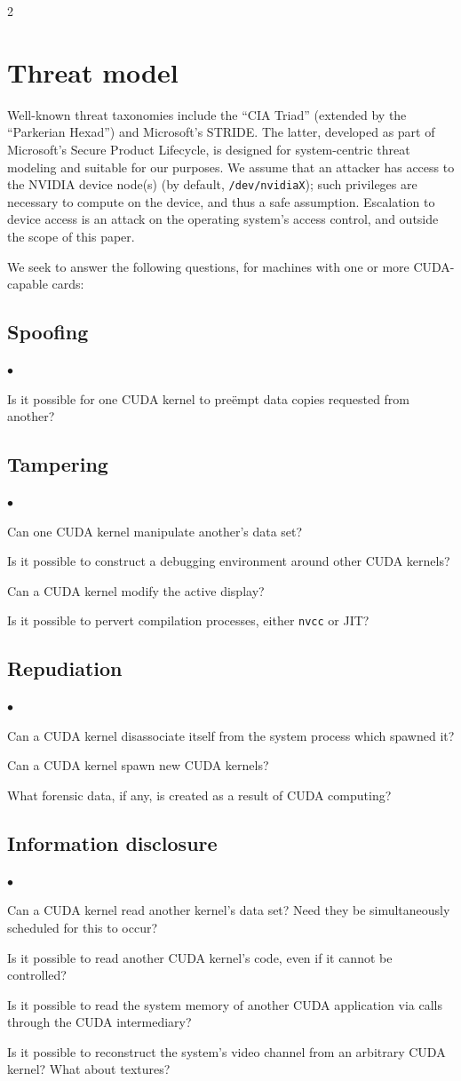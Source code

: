 \documentclass[letterpaper,10pt]{article}
\newcommand{\squishlist}{\begin{list}{$\bullet$}
  {\setlength{\itemsep}{0pt}
    \setlength{\parsep}{3pt}
    \setlength{\topsep}{3pt}
    \setlength{\partopsep}{0pt}
    \setlength{\leftmargin}{1.5em}
    \setlength{\labelwidth}{1em}
    \setlength{\labelsep}{0.5em}
  } }
\newcommand{\squishend}{\end{list}}
\begin{document}
\begin{multicols}{2}
\section{Threat model}
Well-known threat taxonomies include the ``CIA Triad'' (extended by the
``Parkerian Hexad\cite{sechandbook}'') and Microsoft's STRIDE\@. The latter, developed as part of
Microsoft's Secure Product Lifecycle, is designed for system-centric threat
modeling and suitable for our purposes. We assume that an attacker has access
to the NVIDIA device node(s) (by default, \texttt{/dev/nvidiaX}); such privileges
are necessary to compute on the device, and thus a safe assumption. Escalation
to device access is an attack on the operating system's access control, and
outside the scope of this paper.

We seek to answer the following questions, for machines with one or more CUDA-capable
cards:
\subsection{Spoofing}
\squishlist
\item Is it possible for one CUDA kernel to pre\"empt data copies requested
from another?
\squishend
\subsection{Tampering}
\squishlist
\item Can one CUDA kernel manipulate another's data set?
\item Is it possible to construct a debugging environment around other CUDA kernels?
\item Can a CUDA kernel modify the active display?
\item Is it possible to pervert compilation processes, either \texttt{nvcc} or JIT?
\squishend
\subsection{Repudiation}
\squishlist
\item Can a CUDA kernel disassociate itself from the system process which spawned it?
\item Can a CUDA kernel spawn new CUDA kernels?
\item What forensic data, if any, is created as a result of CUDA computing?
\squishend
\subsection{Information disclosure}
\squishlist
\item Can a CUDA kernel read another kernel's data set? Need they be simultaneously
scheduled for this to occur?
\item Is it possible to read another CUDA kernel's code, even if it cannot be
controlled?
\item Is it possible to read the system memory of another CUDA application via
calls through the CUDA intermediary?
\item Is it possible to reconstruct the system's video channel from an arbitrary
CUDA kernel? What about textures?
\squishend

\end{multicols}
\end{document}
